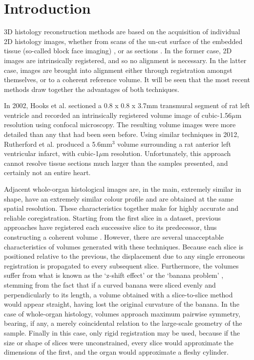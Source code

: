 \section{Introduction} %
\label{sec:introduction}
   3D histology reconstruction methods are based on the acquisition of individual 2D histology images, whether from scans of the un-cut surface of the embedded tissue (so-called block face imaging) \cite{Sands2005,Sands2006,Rutherford2012}, or as sections \cite{Burton2006,Plank2009}. In the former case, 2D images are intrinsically registered, and so no alignment is necessary. In the latter case, images are brought into alignment either through registration amongst themselves, or to a coherent reference volume. It will be seen that the most recent methods draw together the advantages of both techniques.
  
  In 2002, Hooks et al. \cite{Hooks2002} sectioned a 0.8 x 0.8 x 3.7mm transmural segment of rat left ventricle and recorded an intrinsically registered volume image of cubic-1.56$\mu$m resolution using confocal microscopy. The resulting volume images were more detailed than any that had been seen before. Using similar techniques in 2012, Rutherford et al. \cite{Rutherford2012} produced a 5.6mm$^3$ volume surrounding a rat anterior left ventricular infarct, with cubic-1$\mu$m resolution. Unfortunately, this approach cannot resolve tissue sections much larger than the samples presented, and certainly not an entire heart.
  
  Adjacent whole-organ histological images are, in the main, extremely similar in shape, have an extremely similar colour profile and are obtained at the same spatial resolution. These characteristics together make for highly accurate and reliable coregistration. Starting from the first slice in a dataset, previous approaches have registered each successive slice to its predecessor, thus constructing a coherent volume \cite{Chakravarty2006,Schmitt2006,Cifor2009,Cifor2011}. However, there are several unacceptable characteristics of volumes generated with these techniques. Because each slice is positioned relative to the previous, the displacement due to any single erroneous registration is propagated to every subsequent slice. Furthermore, the volumes suffer from what is known as the `z-shift effect' \cite{Yushkevich2006} or the `banana problem' \cite{Malandain2004,Lyon2012}, stemming from the fact that if a curved banana were sliced evenly and perpendicularly to its length, a volume obtained with a slice-to-slice method would appear straight, having lost the original curvature of the banana. In the case of whole-organ histology, volumes approach maximum pairwise symmetry, bearing, if any, a merely coincidental relation to the large-scale geometry of the sample. Finally in this case, only rigid registration may be used, because if the size or shape of slices were unconstrained, every slice would approximate the dimensions of the first, and the organ would approximate a fleshy cylinder.
  
